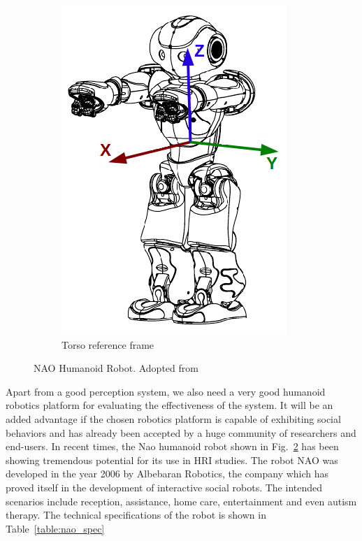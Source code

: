 \begin{figure}[H]
\begin{subfigure}[b]{0.25\textwidth}
\includegraphics[width=\textwidth]{assets/hardware_inertialunit1.png}
\caption{Torso reference frame}
\label{fig:naoreference}
\end{subfigure}
\caption[NAO Humanoid Robot]{NAO Humanoid Robot. {Adopted from \cite{NaoRobot}}}
\label{fig:naorobot}
\end{figure}%
Apart from a good perception system, we also need a very good humanoid robotics platform for evaluating the effectiveness of the system. It will be an added advantage if the chosen robotics platform is capable of exhibiting social behaviors and has already been accepted by a huge community of researchers and end-users. In recent times, the Nao humanoid robot \cite{NaoRobot} shown in Fig.~\ref{fig:naorobot} has been showing tremendous potential for its use in HRI studies. The robot NAO was developed in the year 2006 by Albebaran Robotics, the company which has proved itself in the development of interactive social robots. The intended scenarios include reception, assistance, home care, entertainment and even autism therapy. The technical specifications of the robot is shown in Table~\ref{table:nao_spec}
